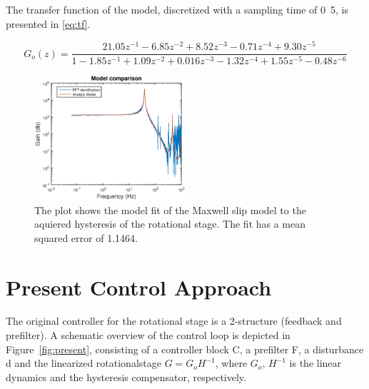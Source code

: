  The transfer function of the model, discretized with a sampling time of \unit{0.5}{\milli\second}, is presented in \eqref{eq:tf}.

\begin{equation}
  \label{eq:tf}
  G_o(z) = \frac{21.05z^{-1} - 6.85z^{-2} + 8.52z^{-3} - 0.71z^{-4} + 9.30z^{-5}}{1 - 1.85z^{-1} + 1.09z^{-2} + 0.016z^{-3} - 1.32z^{-4} + 1.55z^{-5} - 0.48z^{-6}}
\end{equation}

\begin{figure}[h]
  \centering
  \includegraphics[width=0.5\textwidth]{fig/matlab/model.eps}
  \caption{\label{fig:model} The plot shows the model fit of the Maxwell slip model to the aquiered hysteresis of the rotational stage. The fit has a mean squared error of 1.1464.}
\end{figure}


\section{Present Control Approach}
The original controller for the rotational stage is a 2-\abbrDOF structure (feedback and prefilter). A schematic overview of the control loop is depicted in Figure~\ref{fig:present}, consisting of a controller block C, a prefilter F, a disturbance d and the linearized rotationalstage $G =G_oH^{-1}$, where $G_o$, $H^{-1}$ is the linear dynamics and the hysteresis compensator, respectively.

